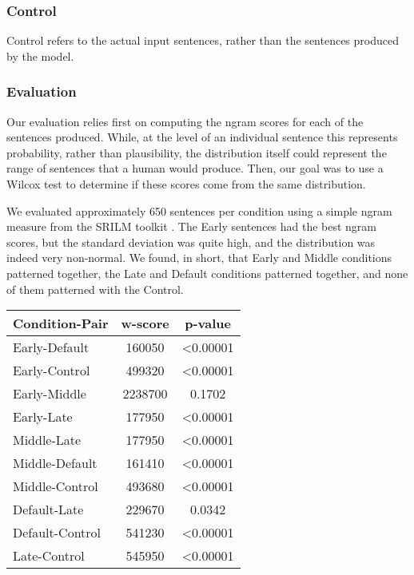 \subsubsection{Control}
Control refers to the actual input sentences, rather than the sentences produced by the model.

\subsubsection{Evaluation}
Our evaluation relies first on computing the ngram scores for each of the sentences produced. While, at the level of an individual sentence this represents probability, rather than plausibility, the distribution itself could represent the range of sentences that a human would produce. Then, our goal was to use a Wilcox test to determine if these scores come from the same distribution.

We evaluated approximately 650 sentences per condition using a simple ngram measure from the SRILM toolkit \cite{srilm}. The Early sentences had the best ngram scores, but the standard deviation was quite high, and the distribution was indeed very non-­normal. We found, in short, that Early and Middle conditions patterned together, the Late and Default conditions patterned together, and none of them patterned with the Control. 

\begin{tabular}{l|cc}
Condition-Pair & w-score & p-value \\ \hline
Early-Default & 160050 & <0.00001 \\
Early-Control & 499320 & <0.00001 \\
Early-Middle & 2238700 & 0.1702 \\
Early-Late & 177950 & <0.00001 \\
Middle-Late & 177950 & <0.00001 \\
Middle-Default & 161410 & <0.00001 \\
Middle-Control & 493680 & <0.00001 \\
Default-Late & 229670 & 0.0342 \\
Default-Control & 541230 & <0.00001 \\
Late-Control & 545950 & <0.00001 
\end{tabular}
